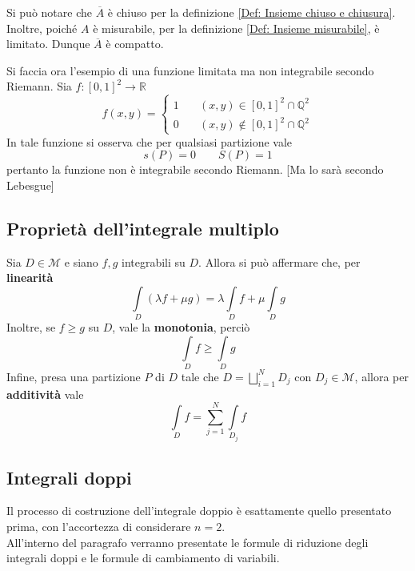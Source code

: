 \begin{oss}
    Si può notare che $\overline{A}$ è chiuso per la definizione \ref{Def: Insieme chiuso e chiusura}. Inoltre, poiché $A$ è misurabile, per la definizione \ref{Def: Insieme misurabile}, è limitato. Dunque $\overline{A}$ è compatto.
\end{oss}
\begin{example}
    Si faccia ora l'esempio di una funzione limitata ma non integrabile secondo Riemann. Sia $f: [0,1]^2 \to \mathbb{R}$
    \begin{equation*}
    f(x, y)=\begin{cases}
        1 \quad & (x,y) \in [0,1]^2 \cap \mathbb{Q}^2\\
        0 \quad & (x,y) \notin [0,1]^2 \cap \mathbb{Q}^2
    \end{cases}
    \end{equation*}
    In tale funzione si osserva che per qualsiasi partizione vale
    \begin{equation*}
        s(P)=0 \qquad S(P)=1 
    \end{equation*}
    pertanto la funzione non è integrabile secondo Riemann. [Ma lo sarà secondo Lebesgue]
\end{example}
\subsection{Proprietà dell'integrale multiplo}
Sia $D \in \mathcal{M}$ e siano $f, g$ integrabili su $D$.
Allora si può affermare che, per \textbf{linearità}
\begin{equation}
    \int\limits_D{(\lambda f+ \mu g)}= \lambda \int\limits_D{f}+ \mu \int\limits_D g
\end{equation}
Inoltre, se $ f \geq g$ su $D$, vale la \textbf{monotonia}, perciò
\begin{equation}
    \int\limits_D{f} \geq \int\limits_D{g}
\end{equation}
Infine, presa una partizione $P$ di $D$ tale che $D= \bigsqcup\limits_{i=1}^{N} D_j$ con $D_j \in \mathcal{M}$, allora per \textbf{additività} vale
\begin{equation}
    \int\limits_D{f}= \sum\limits_{j=1}^{N}{\int\limits_{D_j}{f}}
\end{equation}
\subsection{Integrali doppi}
Il processo di costruzione dell'integrale doppio è esattamente quello presentato prima, con l'accortezza di considerare $n=2$.\\
All'interno del paragrafo verranno presentate le formule di riduzione degli integrali doppi e le formule di cambiamento di variabili.
